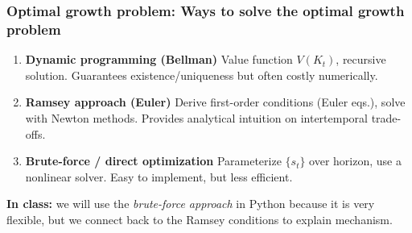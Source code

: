 \documentclass[xcolor=x11names,compress,aspectratio=169]{beamer}%
\begin{document}
\begin{frame}%
%

\frametitle{Optimal growth problem: Ways to solve the optimal growth problem}%


\begin{enumerate}
\item \textbf{Dynamic programming (Bellman)} Value function $V(K_{t})$,
recursive solution. Guarantees existence/uniqueness but often costly
numerically. \vspace{0.3cm}

\item \textbf{Ramsey approach (Euler)} Derive first-order conditions (Euler
eqs.), solve with Newton methods. Provides analytical intuition on
intertemporal trade-offs. \vspace{0.3cm}

\item \textbf{Brute-force / direct optimization} Parameterize $\{s_{t}\}$ over
horizon, use a nonlinear solver. Easy to implement, but less efficient.
\end{enumerate}

\vspace{0.4cm} \textbf{In class:} we will use the \emph{brute-force approach}
in Python because it is very flexible, but we connect back to the Ramsey
conditions to explain mechanism.%

\transboxout
\end{frame}%
%
\end{document}
